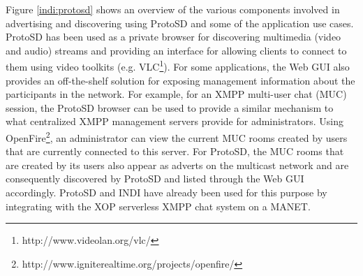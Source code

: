 Figure \ref{indi:protosd} shows an overview of the various components involved in advertising and discovering using ProtoSD and some of the application use cases.   ProtoSD has been used as a private browser for discovering multimedia (video and audio) streams and providing an interface for allowing clients to connect to them using video toolkits (e.g. VLC\footnote{http://www.videolan.org/vlc/}).  For some applications, the Web GUI also provides an off-the-shelf solution for exposing management information about the participants in the network.  For example, for an XMPP multi-user chat (MUC) session, the ProtoSD browser can be used to provide a similar mechanism to what centralized XMPP management servers provide for administrators. Using OpenFire\footnote{http://www.igniterealtime.org/projects/openfire/}, an administrator can view the current MUC rooms created by users that are currently connected to this server.   For ProtoSD, the MUC rooms that are created by its users also appear as adverts on the multicast network and are consequently discovered by ProtoSD and listed through the Web GUI accordingly.  ProtoSD and INDI have already been used for this purpose by integrating with the XOP\cite{xop2010} serverless XMPP chat system on a MANET. 


